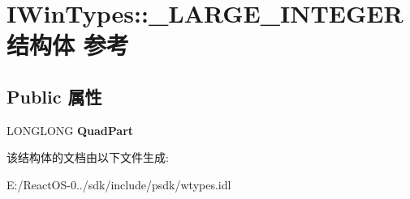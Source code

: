 \hypertarget{struct_i_win_types_1_1___l_a_r_g_e___i_n_t_e_g_e_r}{}\section{I\+Win\+Types\+:\+:\+\_\+\+L\+A\+R\+G\+E\+\_\+\+I\+N\+T\+E\+G\+E\+R结构体 参考}
\label{struct_i_win_types_1_1___l_a_r_g_e___i_n_t_e_g_e_r}
\subsection*{Public 属性}
\begin{DoxyCompactItemize}
\item 
\mbox{\label{struct_i_win_types_1_1___l_a_r_g_e___i_n_t_e_g_e_r_a9806c2270d63f2ff90888d4008183a08}} 
L\+O\+N\+G\+L\+O\+NG {\bfseries Quad\+Part}
\end{DoxyCompactItemize}


该结构体的文档由以下文件生成\+:\begin{DoxyCompactItemize}
\item 
E\+:/\+React\+O\+S-\/0../sdk/include/psdk/wtypes.\+idl\end{DoxyCompactItemize}
